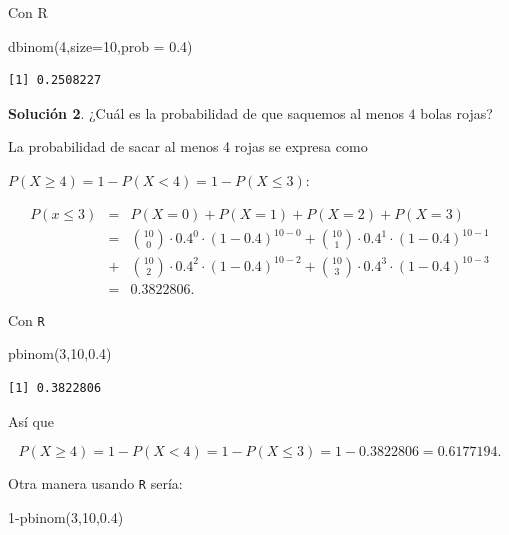\documentclass[
  letterpaper,
  DIV=11,
  numbers=noendperiod]{scrreprt}
\newenvironment{Shaded}{\begin{snugshade}}{\end{snugshade}}
\newcommand{\AttributeTok}[1]{\textcolor[rgb]{0.40,0.45,0.13}{#1}}
\newcommand{\DecValTok}[1]{\textcolor[rgb]{0.68,0.00,0.00}{#1}}
\newcommand{\FloatTok}[1]{\textcolor[rgb]{0.68,0.00,0.00}{#1}}
\newcommand{\FunctionTok}[1]{\textcolor[rgb]{0.28,0.35,0.67}{#1}}
\newcommand{\NormalTok}[1]{\textcolor[rgb]{0.00,0.23,0.31}{#1}}
\newcommand{\SpecialCharTok}[1]{\textcolor[rgb]{0.37,0.37,0.37}{#1}}
\begin{document}
Con R

\begin{Shaded}
\begin{Highlighting}[]
\FunctionTok{dbinom}\NormalTok{(}\DecValTok{4}\NormalTok{,}\AttributeTok{size=}\DecValTok{10}\NormalTok{,}\AttributeTok{prob =} \FloatTok{0.4}\NormalTok{)}
\end{Highlighting}
\end{Shaded}

\begin{verbatim}
[1] 0.2508227
\end{verbatim}

\textbf{Solución 2}. ¿Cuál es la probabilidad de que saquemos al menos
\(4\) bolas rojas?

La probabilidad de sacar al menos 4 rojas se expresa como

\(P(X \geq  4)=1-P(X<4)=1-P(X\leq 3):\)

\begin{eqnarray*}
P(x\leq 3)&=& P(X=0)+P(X=1)+P(X=2)+P(X=3)\\
&=& 
 {10\choose 0}\cdot 0.4^0\cdot (1-0.4)^{10-0}+ {10\choose 1}\cdot 0.4^1\cdot (1-0.4)^{10-1}\\
&+&{10\choose 2}\cdot 0.4^2\cdot (1-0.4)^{10-2}+ {10\choose 3}\cdot 0.4^3\cdot (1-0.4)^{10-3}\\
&=&0.3822806.
\end{eqnarray*}

Con \texttt{R}

\begin{Shaded}
\begin{Highlighting}[]
\FunctionTok{pbinom}\NormalTok{(}\DecValTok{3}\NormalTok{,}\DecValTok{10}\NormalTok{,}\FloatTok{0.4}\NormalTok{)}
\end{Highlighting}
\end{Shaded}

\begin{verbatim}
[1] 0.3822806
\end{verbatim}

Así que

\[P(X \geq 4 )=1-P(X< 4)=1-P(X\leq 3)=1-0.3822806=0.6177194.\]

Otra manera usando \texttt{R} sería:

\begin{Shaded}
\begin{Highlighting}[]
\DecValTok{1}\SpecialCharTok{{-}}\FunctionTok{pbinom}\NormalTok{(}\DecValTok{3}\NormalTok{,}\DecValTok{10}\NormalTok{,}\FloatTok{0.4}\NormalTok{)}
\end{Highlighting}
\end{Shaded}
\end{document}
